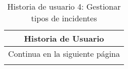 


\begin{longtable}{|p{6.7cm}|p{6.7cm}|}
    \caption{Historia de usuario 4: Gestionar tipos de incidentes} \label{tab:historia-4}
    \\
    \hline
    \multicolumn{2}{|c|}{\textbf{Historia de Usuario}}                                                                                                                     \\
    \hline

    \endfirsthead

    \hline
    \endhead

    \hline
    \multicolumn{2}{|c|}{{Continua en la siguiente página}}                                                                                                                \\
    \hline
    \endfoot

    \hline
    \endlastfoot


\end{longtable}
